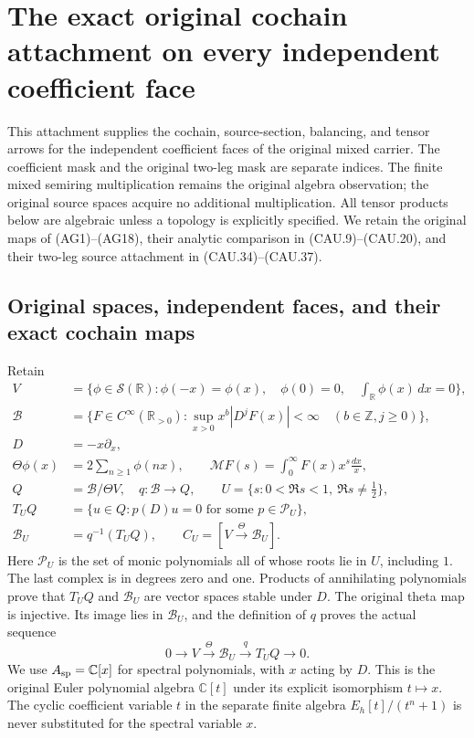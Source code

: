 \section{The exact original cochain attachment on every independent coefficient face}
\label{sec:coefficient-face-cochain-attachment}

This attachment supplies the cochain, source-section, balancing, and tensor
arrows for the independent coefficient faces of the original mixed carrier.
The coefficient mask and the original two-leg mask are separate indices.
The finite mixed semiring multiplication remains the original algebra
observation; the original source spaces acquire no additional multiplication.
All tensor products below are algebraic unless a topology is explicitly
specified.  We retain the original maps of (AG1)--(AG18), their analytic
comparison in (CAU.9)--(CAU.20), and their two-leg source attachment in
(CAU.34)--(CAU.37).

\subsection{Original spaces, independent faces, and their exact cochain maps}

Retain
\[
\begin{split}
 V&=\{\phi\in\mathcal S(\mathbb R):\phi(-x)=\phi(x),\quad
       \phi(0)=0,\quad\textstyle\int_{\mathbb R}\phi(x)\,dx=0\},\\
 \mathscr B&=\{F\in C^\infty(\mathbb R_{>0}):
       \sup_{x>0}x^b|D^jF(x)|<\infty\quad(b\in\mathbb Z,j\ge0)\},\\
 D&=-x\partial_x,\\
 \Theta\phi(x)&=2\sum_{n\ge1}\phi(nx),\qquad
 \mathcal MF(s)=\int_0^\infty F(x)x^s\frac{dx}{x},\\
 Q&=\mathscr B/\Theta V,\quad q:\mathscr B\to Q,\qquad
 U=\{s:0<\Re s<1,\ \Re s\ne\tfrac12\},\\
 T_UQ&=\{u\in Q:p(D)u=0\text{ for some }p\in\mathcal P_U\},\\
 \mathscr B_U&=q^{-1}(T_UQ),\qquad C_U=[V\xrightarrow{\Theta}\mathscr B_U].
\end{split}                                                     \tag{CFA.1}
\]
Here $\mathcal P_U$ is the set of monic polynomials all of whose roots
lie in $U$, including $1$.  The last complex is in degrees zero and one.
Products of annihilating polynomials prove that $T_UQ$ and
$\mathscr B_U$ are vector spaces stable under $D$.  The original
theta map is injective.  Its image lies in $\mathscr B_U$, and the
definition of $q$ proves the actual sequence
\[
 0\longrightarrow V\xrightarrow{\Theta}\mathscr B_U
           \xrightarrow{q}T_UQ\longrightarrow0.                \tag{CFA.2}
\]
We use $A_{\rm sp}=\mathbb C[x]$ for spectral polynomials, with $x$
acting by $D$.  This is the original Euler polynomial algebra
$\mathbb C[t]$ under its explicit isomorphism $t\mapsto x$.
The cyclic coefficient variable $t$ in the separate finite algebra
$E_h[t]/(t^n+1)$ is never substituted for the spectral variable $x$.

